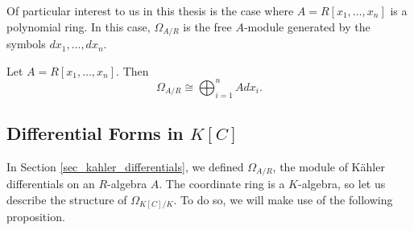 Of particular interest to us in this thesis is the case where $A = R[x_1, \ldots, x_n]$ is a polynomial ring.
In this case, $\Omega_{A/R}$ is the free $A$-module generated by the symbols $dx_1, \ldots, dx_n$.
\begin{proposition}
  \label{prop_differential_module_of_polynomial_ring}
  Let $A = R[x_1, \ldots, x_n]$. Then
  \[ \Omega_{A/R} \cong \bigoplus_{i=1}^n Adx_i. \]
\end{proposition}
\begin{comment}
\begin{corollary}
  Let $A = R[x_1, \ldots, x_n]$, let $I$ be an ideal of $A$, and let $B = A/I$.
  Then $B$ is an $R$-algebra and
  \[ B \otimes_{R} \Omega_{A/R} \cong \bigoplus_{i=1}^n Bdx_i. \]
\end{corollary}
\begin{proof}
  \note{Extension of scalars.}
\end{proof}
Here $\otimes_R$ denotes the tensor product of algebra.
We will use this corollary in Chapter \ref{chap_curves}, after defining the coordinate ring of a curve,
when relating differentials forms of a polynomial ring to those of a coordinate ring.
Since $\Omega_{A/R}$ is a direct sum of $R$-algebras $Adx_i$,
there is a family of natural projection maps 
  \[ \pi_i : \Omega_{A/R} \to Adx_i : \sum f_jdx_j \mapsto f_idx_i. \]
We can compose the maps
  \[ \begin{tikzcd}
    A \arrow{r}{d} & \Omega_{A/R} \arrow{r}{\pi_i} & Adx_i \arrow{r}{} & A
  \end{tikzcd} \]
where the right-most map sends $dx_i \mapsto 1$.
The composition of the three maps is the formal partial derivative with respect to $x_i$.
\end{comment}




\subsection{Differential Forms in $K[C]$}
\label{sec_differentials_in_coordinate_ring}

In Section \ref{sec_kahler_differentials}, we defined $\Omega_{A/R}$,
the module of K\"ahler differentials on an $R$-algebra $A$.
The coordinate ring is a $K$-algebra, so let us describe the structure of $\Omega_{K[C]/K}$.
To do so, we will make use of the following proposition.


